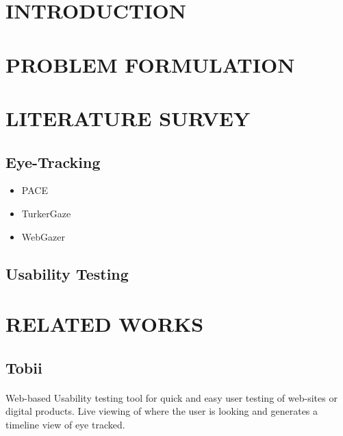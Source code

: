 \documentclass[a4paper,12pt,oneside]{article}
\begin{document}
\newpage
\rfoot{\thepage}
\rfoot{\thepage}
\renewcommand{\headrulewidth}{0.0pt}
\renewcommand{\footrulewidth}{0.0pt}
\renewcommand{\headrulewidth}{0.0pt}
\renewcommand{\footrulewidth}{0.0pt}
\section{INTRODUCTION}
\paragraph{}


\newpage
\section{PROBLEM FORMULATION}
\paragraph{}

\newpage
\section{LITERATURE SURVEY}
\subsection{Eye-Tracking}
    \begin{itemize} 
        \item PACE
        \item TurkerGaze
        \item WebGazer
    \end{itemize}

\subsection{Usability Testing}

\newpage
\section{RELATED WORKS}
\subsection{Tobii}
\paragraph{}
Web-based Usability testing tool for quick and easy user testing of web-sites or digital products. Live viewing of where the user is looking and generates a timeline view of eye tracked.
\end{document}
